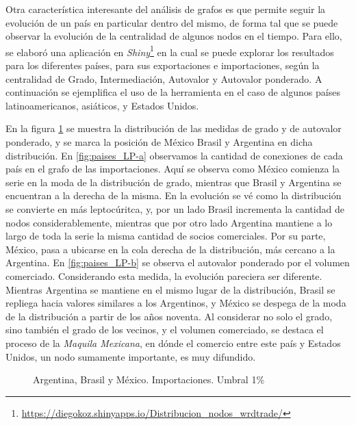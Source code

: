 \documentclass[class=article, crop=false]{standalone}
\begin{document}
Otra característica interesante del análisis de grafos es que permite seguir la evolución de un país en particular dentro del mismo, de forma tal que se puede observar la evolución de la centralidad de algunos nodos en el tiempo. Para ello, se elaboró una aplicación en \textit{Shiny}\footnote{\url{https://diegokoz.shinyapps.io/Distribucion_nodos_wrdtrade/}} en la cual se puede explorar los resultados para los diferentes países, para sus exportaciones e importaciones, según la centralidad de Grado, Intermediación, Autovalor y Autovalor ponderado. A continuación se ejemplifica el uso de la herramienta en el caso de algunos países latinoamericanos, asiáticos, y Estados Unidos.    \par
En la figura \ref{fig:paises_LP} se muestra la distribución de las medidas de grado y de autovalor ponderado, y se marca la posición de México Brasil y Argentina en dicha distribución. 
En \ref{fig:paises_LP-a} observamos la cantidad de conexiones de cada país en el grafo de las importaciones. Aquí se observa como México comienza la serie en la moda de la distribución de grado, mientras que Brasil y Argentina se encuentran a la derecha de la misma. En la evolución se vé como la distribución se convierte en más leptocúritca, y, por un lado Brasil incrementa la cantidad de nodos considerablemente, mientras que por otro lado Argentina mantiene a lo largo de toda la serie la misma cantidad de socios comerciales. Por su parte, México, pasa a ubicarse en la cola derecha de la distribución, más cercano a la Argentina. 
En \ref{fig:paises_LP-b} se observa el autovalor ponderado por el volumen comerciado. Considerando esta medida, la evolución pareciera ser diferente. Mientras Argentina se mantiene en el mismo lugar de la distribución, Brasil se repliega hacia valores similares a los Argentinos, y México se despega de la moda de la distribución a partir de los años noventa. Al considerar no solo el grado, sino también el grado de los vecinos, y el volumen comerciado, se destaca el proceso de la \textit{Maquila Mexicana}, en dónde el comercio entre este país y Estados Unidos, un nodo sumamente importante, es muy difundido. 

\begin{figure}[h!]
	\centering
	\caption{Argentina, Brasil y México. Importaciones. Umbral 1\%}
	\label{fig:paises_LP}
\end{figure}
\end{document}
